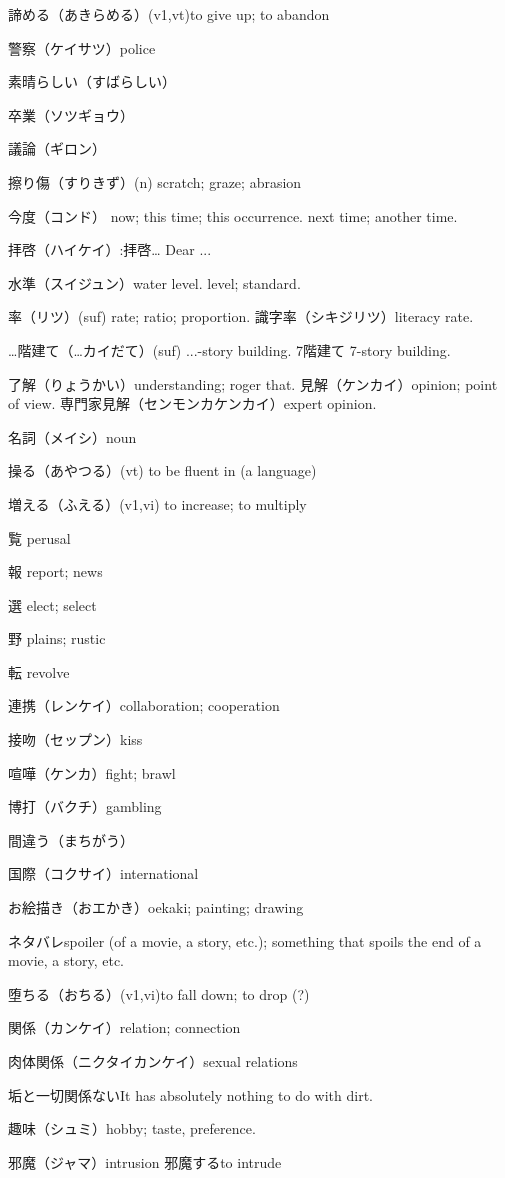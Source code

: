 諦める（あきらめる）(v1,vt)to give up; to abandon

警察（ケイサツ）police

素晴らしい（すばらしい）

卒業（ソツギョウ）

議論（ギロン）

擦り傷（すりきず）(n) scratch; graze; abrasion

今度（コンド）
now; this time; this occurrence.
next time; another time.

拝啓（ハイケイ）:拝啓… Dear ...

水準（スイジュン）water level. level; standard.

率（リツ）(suf) rate; ratio; proportion.
識字率（シキジリツ）literacy rate.

…階建て（…カイだて）(suf) ...-story building.
7階建て 7-story building.

了解（りょうかい）understanding; roger that.
見解（ケンカイ）opinion; point of view.
専門家見解（センモンカケンカイ）expert opinion.

名詞（メイシ）noun

操る（あやつる）(vt) to be fluent in (a language)

増える（ふえる）(v1,vi) to increase; to multiply

覧 perusal

報 report; news

選 elect; select

野 plains; rustic

転 revolve

連携（レンケイ）collaboration; cooperation

接吻（セップン）kiss

喧嘩（ケンカ）fight; brawl

博打（バクチ）gambling

間違う（まちがう）

国際（コクサイ）international

お絵描き（おエかき）oekaki; painting; drawing

ネタバレspoiler (of a movie, a story, etc.); something that spoils the end of a movie, a story, etc.

堕ちる（おちる）(v1,vi)to fall down; to drop (?)

関係（カンケイ）relation; connection

肉体関係（ニクタイカンケイ）sexual relations

垢と一切関係ないIt has absolutely nothing to do with dirt.

趣味（シュミ）hobby; taste, preference.

邪魔（ジャマ）intrusion
邪魔するto intrude
